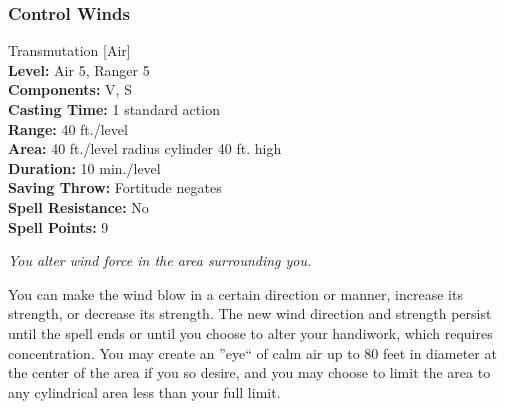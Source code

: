 \subsubsection{Control Winds}
\label{Spell:ControlWinds}
Transmutation [Air]
\\ \textbf{Level:} Air 5, Ranger 5
\\ \textbf{Components:} V, S
\\ \textbf{Casting Time:} 1 standard action
\\ \textbf{Range:} 40 ft./level
\\ \textbf{Area:} 40 ft./level radius cylinder 40 ft. high
\\ \textbf{Duration:} 10 min./level
\\ \textbf{Saving Throw:} Fortitude negates
\\ \textbf{Spell Resistance:} No
\\ \textbf{Spell Points:} 9

\emph{You alter wind force in the area surrounding you. }

You can make the wind blow in a certain direction or manner, increase its strength, or decrease its strength. The new wind direction and strength persist until the spell ends or until you choose to alter your handiwork, which requires concentration. You may create an ''eye`` of calm air up to 80 feet in diameter at the center of the area if you so desire, and you may choose to limit the area to any cylindrical area less than your full limit.

